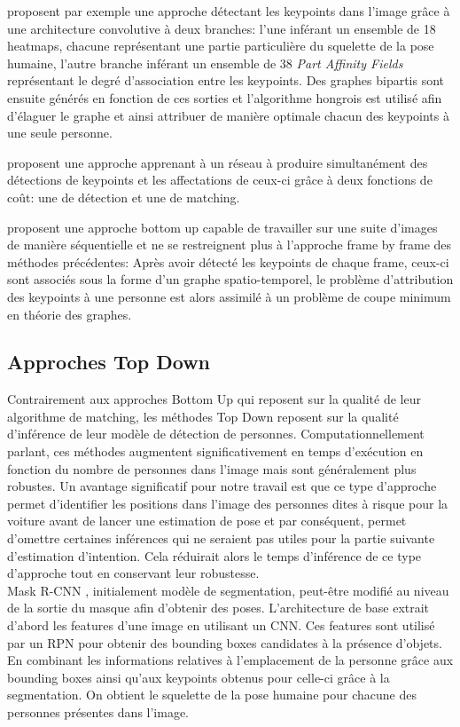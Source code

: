 \cite{cao2017realtime} proposent par exemple une approche détectant les keypoints dans l'image grâce à une architecture convolutive à deux branches: l'une inférant un ensemble de 18 heatmaps, chacune représentant une partie particulière du squelette de la pose humaine, l'autre branche inférant un ensemble de 38 \textit{Part Affinity Fields} représentant le degré d'association entre les keypoints. Des graphes bipartis sont ensuite générés en fonction de ces sorties et l'algorithme hongrois est utilisé afin d'élaguer le graphe et ainsi attribuer de manière optimale chacun des keypoints à une seule personne.

\cite{627f7b8a4a3441f28d400cfbd7a32b80} proposent une approche apprenant à un réseau à produire simultanément des détections de keypoints et les affectations de ceux-ci grâce à deux fonctions de coût: une de détection et une de matching.

\cite{DBLP:journals/corr/InsafutdinovAPT16} proposent une approche bottom up capable de travailler sur une suite d'images de manière séquentielle et ne se restreignent plus à l'approche frame by frame des méthodes précédentes: Après avoir détecté les keypoints de chaque frame, ceux-ci sont associés sous la forme d'un graphe spatio-temporel, le problème d'attribution des keypoints à une personne est alors assimilé à un problème de coupe minimum en théorie des graphes.

\subsection{Approches Top Down}
Contrairement aux approches Bottom Up qui reposent sur la qualité de leur algorithme de matching, les méthodes Top Down reposent sur la qualité d'inférence de leur modèle de détection de personnes. Computationnellement parlant, ces méthodes augmentent significativement en temps d'exécution en fonction du nombre de personnes dans l'image mais sont généralement plus robustes. Un avantage significatif pour notre travail est que ce type d'approche permet d'identifier les positions dans l'image des personnes dites à risque pour la voiture avant de lancer une estimation de pose et par conséquent, permet d'omettre certaines inférences qui ne seraient pas utiles pour la partie suivante d'estimation d'intention. Cela réduirait alors le temps d'inférence de ce type d'approche tout en conservant leur robustesse.\\

Mask R-CNN \cite{2017arXiv170306870H}, initialement modèle de segmentation, peut-être modifié au niveau de la sortie du masque afin d'obtenir des poses. L'architecture de base extrait d'abord les features d'une image en utilisant un CNN. Ces features sont utilisé par un RPN pour obtenir des bounding boxes candidates à la présence d'objets. En combinant les informations relatives à l'emplacement de la personne grâce aux bounding boxes ainsi qu'aux keypoints obtenus pour celle-ci grâce à la segmentation. On obtient le squelette de la pose humaine pour chacune des personnes présentes dans l'image.


